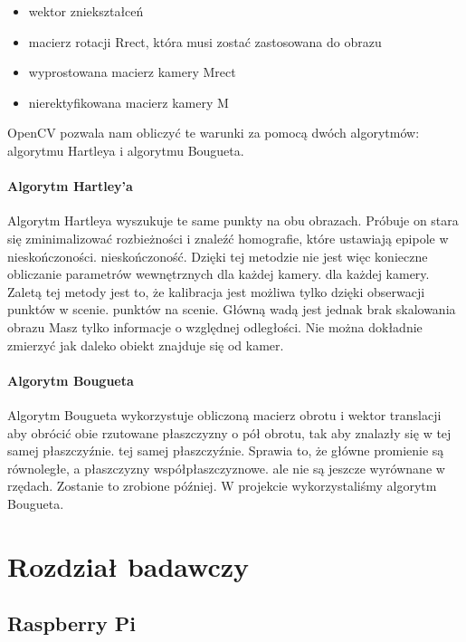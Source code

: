 \documentclass[magisterska]{pracadypl}
\begin{document}
\begin{itemize}
  \item wektor zniekształceń
  \item macierz rotacji Rrect, która musi zostać zastosowana do obrazu
  \item wyprostowana macierz kamery Mrect
  \item nierektyfikowana macierz kamery M
\end{itemize}

OpenCV pozwala nam obliczyć te warunki za pomocą dwóch algorytmów: algorytmu Hartleya
i algorytmu Bougueta.

\subsubsection{Algorytm Hartley'a}

Algorytm Hartleya wyszukuje te same punkty na obu obrazach. Próbuje on
stara się zminimalizować rozbieżności i znaleźć homografie, które ustawiają epipole w nieskończoności.
nieskończoność. Dzięki tej metodzie nie jest więc konieczne obliczanie parametrów wewnętrznych dla każdej kamery.
dla każdej kamery.
Zaletą tej metody jest to, że kalibracja jest możliwa tylko dzięki obserwacji punktów w scenie.
punktów na scenie. Główną wadą jest jednak brak skalowania obrazu
Masz tylko informacje o względnej odległości. Nie można dokładnie zmierzyć
jak daleko obiekt znajduje się od kamer.

\subsubsection{Algorytm Bougueta}

Algorytm Bougueta wykorzystuje obliczoną macierz obrotu i wektor translacji
aby obrócić obie rzutowane płaszczyzny o pół obrotu, tak aby znalazły się w tej samej płaszczyźnie.
tej samej płaszczyźnie. Sprawia to, że główne promienie są równoległe, a płaszczyzny współpłaszczyznowe.
ale nie są jeszcze wyrównane w rzędach. Zostanie to zrobione później.
W projekcie wykorzystaliśmy algorytm Bougueta.

\chapter{Rozdział badawczy}

\section{Raspberry Pi}
\end{document}
